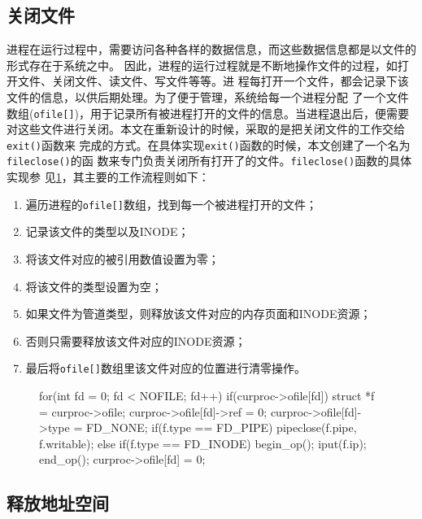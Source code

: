 \documentclass{swfuthesism}
\begin{document}
\subsection{关闭文件}
进程在运行过程中，需要访问各种各样的数据信息，而这些数据信息都是以文件的形式存在于系统之中。
因此，进程的运行过程就是不断地操作文件的过程，如打开文件、关闭文件、读文件、写文件等等。进
程每打开一个文件，都会记录下该文件的信息，以供后期处理。为了便于管理，系统给每一个进程分配
了一个文件数组(\texttt{ofile[]})，用于记录所有被进程打开的文件的信息。当进程退出后，便需要
对这些文件进行关闭。本文在重新设计的时候，采取的是把关闭文件的工作交给\texttt{exit()}函数来
完成的方式。在具体实现\texttt{exit()}函数的时候，本文创建了一个名为\texttt{fileclose()}的函
数来专门负责关闭所有打开了的文件。\texttt{fileclose()}函数的具体实现参
见\ref{fig:lst:filecode}，其主要的工作流程则如下：
\begin{enumerate}
\item 遍历进程的\texttt{ofile[]}数组，找到每一个被进程打开的文件；
\item 记录该文件的类型以及INODE；
\item 将该文件对应的被引用数值设置为零；
\item 将该文件的类型设置为空；
\item 如果文件为管道类型，则释放该文件对应的内存页面和INODE资源；
\item 否则只需要释放该文件对应的INODE资源；
\item 最后将\texttt{ofile[]}数组里该文件对应的位置进行清零操作。
\end{enumerate}

\begin{figure}
  \begin{codeblock}
\begin{ccode}
for(int fd = 0; fd < NOFILE; fd++){
  if(curproc->ofile[fd]){
    struct *f = curproc->ofile;
    curproc->ofile[fd]->ref = 0;
    curproc->ofile[fd]->type = FD_NONE;
    if(f.type == FD_PIPE)
      pipeclose(f.pipe, f.writable);
    else if(f.type == FD_INODE){
      begin_op();
      iput(f.ip);
      end_op();
    }
    curproc->ofile[fd] = 0;
  }
}  
\end{ccode}
  \end{codeblock}
  \label{fig:lst:filecode}
\end{figure} 

\subsection{释放地址空间}
\end{document}
